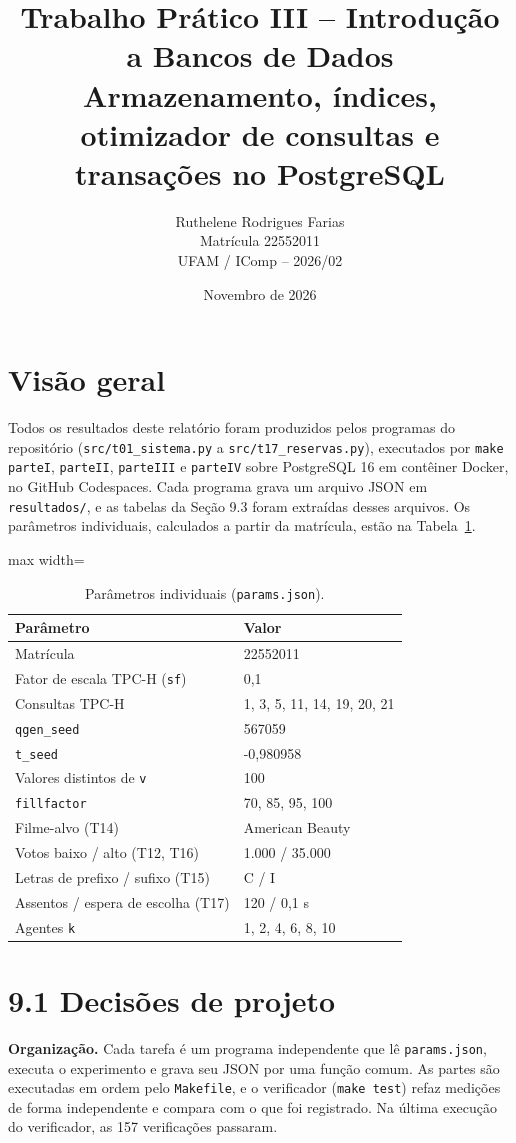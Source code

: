 \documentclass[11pt,a4paper]{article}
\title{\textbf{Trabalho Prático III -- Introdução a Bancos de Dados}\\[0.3em]
\large Armazenamento, índices, otimizador de consultas e transações no PostgreSQL}
\author{Ruthelene Rodrigues Farias\\Matrícula 22552011\\UFAM / IComp -- 2026/02}
\date{Novembro de 2026}
\newcommand{\tp}[1]{\texttt{#1}}
\begin{document}
\maketitle

\section*{Visão geral}
Todos os resultados deste relatório foram produzidos pelos programas do repositório (\tp{src/t01\_sistema.py} a \tp{src/t17\_reservas.py}), executados por \tp{make parteI}, \tp{parteII}, \tp{parteIII} e \tp{parteIV} sobre PostgreSQL 16 em contêiner Docker, no GitHub Codespaces. Cada programa grava um arquivo JSON em \tp{resultados/}, e as tabelas da Seção 9.3 foram extraídas desses arquivos. Os parâmetros individuais, calculados a partir da matrícula, estão na Tabela~\ref{tab:params}.

\begin{table}[H]\centering\small
\caption{Parâmetros individuais (\texttt{params.json}).}\label{tab:params}
\begin{adjustbox}{max width=\linewidth}\begin{tabular}{ll}
\toprule
Parâmetro & Valor \\
\midrule
Matrícula & 22552011 \\
Fator de escala TPC-H (\texttt{sf}) & 0,1 \\
Consultas TPC-H & 1, 3, 5, 11, 14, 19, 20, 21 \\
\texttt{qgen\_seed} & 567059 \\
\texttt{t\_seed} & -0,980958 \\
Valores distintos de \texttt{v} & 100 \\
\texttt{fillfactor} & 70, 85, 95, 100 \\
Filme-alvo (T14) & American Beauty \\
Votos baixo / alto (T12, T16) & 1.000 / 35.000 \\
Letras de prefixo / sufixo (T15) & C / I \\
Assentos / espera de escolha (T17) & 120 / 0,1 s \\
Agentes \texttt{k} & 1, 2, 4, 6, 8, 10 \\
\bottomrule
\end{tabular}\end{adjustbox}
\end{table}

\section*{9.1 Decisões de projeto}
\textbf{Organização.} Cada tarefa é um programa independente que lê \tp{params.json}, executa o experimento e grava seu JSON por uma função comum. As partes são executadas em ordem pelo \tp{Makefile}, e o verificador (\tp{make test}) refaz medições de forma independente e compara com o que foi registrado. Na última execução do verificador, as 157 verificações passaram.
\end{document}
